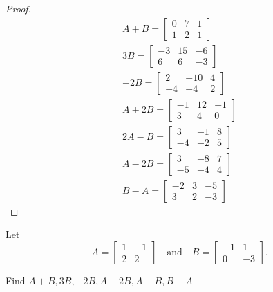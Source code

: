 \begin{proof}
    \[
        \begin{split}
            A + B = \begin{bmatrix}
                0 & 7 & 1 \\
                1 & 2 & 1
            \end{bmatrix} \\
            3B = \begin{bmatrix}
                -3 & 15 & -6 \\
                6  & 6  & -3
            \end{bmatrix} \\
            -2B = \begin{bmatrix}
                2  & -10 & 4 \\
                -4 & -4  & 2
            \end{bmatrix} \\
            A + 2B = \begin{bmatrix}
                -1 & 12 & -1 \\
                3  & 4  & 0
            \end{bmatrix} \\
            2A - B = \begin{bmatrix}
                3  & -1 & 8 \\
                -4 & -2 & 5
            \end{bmatrix} \\
            A - 2B = \begin{bmatrix}
                3  & -8 & 7 \\
                -5 & -4 & 4
            \end{bmatrix} \\
            B - A = \begin{bmatrix}
                -2 & 3 & -5 \\
                3  & 2 & -3
            \end{bmatrix}
        \end{split}
    \]
\end{proof}

\begin{exercise}
    Let
    \[
        A = \begin{bmatrix}
            1 & -1 \\
            2 & 2
        \end{bmatrix}
        \quad\text{and}\quad
        B = \begin{bmatrix}
            -1 & 1  \\
            0  & -3
        \end{bmatrix}.
    \]

    Find $A + B, 3B, -2B, A + 2B, A - B, B - A$
\end{exercise}


